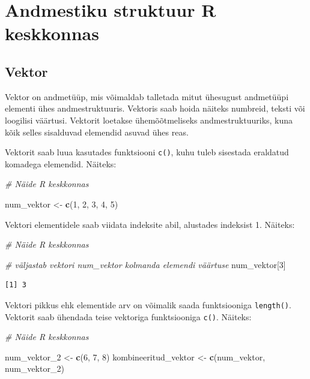 \documentclass[
]{book}
\newenvironment{Shaded}{\begin{snugshade}}{\end{snugshade}}
\newcommand{\CommentTok}[1]{\textcolor[rgb]{0.56,0.35,0.01}{\textit{#1}}}
\newcommand{\DecValTok}[1]{\textcolor[rgb]{0.00,0.00,0.81}{#1}}
\newcommand{\FunctionTok}[1]{\textcolor[rgb]{0.13,0.29,0.53}{\textbf{#1}}}
\newcommand{\NormalTok}[1]{#1}
\newcommand{\OtherTok}[1]{\textcolor[rgb]{0.56,0.35,0.01}{#1}}
\renewenvironment{Shaded} {\begin{snugshade}\footnotesize} {\end{snugshade}}
\begin{document}
\section{Andmestiku struktuur R keskkonnas}\label{andmestiku-struktuur-r-keskkonnas}

\subsection{Vektor}\label{vektor}

Vektor on andmetüüp, mis võimaldab talletada mitut ühesugust andmetüüpi elementi ühes andmestruktuuris. Vektoris saab hoida näiteks numbreid, teksti või loogilisi väärtusi. Vektorit loetakse ühemõõtmeliseks andmestruktuuriks, kuna kõik selles sisalduvad elemendid asuvad ühes reas.

Vektorit saab luua kasutades funktsiooni \texttt{c()}, kuhu tuleb sisestada eraldatud komadega elemendid. Näiteks:

\begin{Shaded}
\begin{Highlighting}[]
\CommentTok{\# Näide R keskkonnas}

\NormalTok{num\_vektor }\OtherTok{\textless{}{-}} \FunctionTok{c}\NormalTok{(}\DecValTok{1}\NormalTok{, }\DecValTok{2}\NormalTok{, }\DecValTok{3}\NormalTok{, }\DecValTok{4}\NormalTok{, }\DecValTok{5}\NormalTok{)}
\end{Highlighting}
\end{Shaded}

Vektori elementidele saab viidata indeksite abil, alustades indeksist 1. Näiteks:

\begin{Shaded}
\begin{Highlighting}[]
\CommentTok{\# Näide R keskkonnas}

\CommentTok{\# väljastab vektori num\_vektor kolmanda elemendi väärtuse}
\NormalTok{num\_vektor[}\DecValTok{3}\NormalTok{] }
\end{Highlighting}
\end{Shaded}

\begin{verbatim}
[1] 3
\end{verbatim}

Vektori pikkus ehk elementide arv on võimalik saada funktsiooniga \texttt{length()}. Vektorit saab ühendada teise vektoriga funktsiooniga \texttt{c()}. Näiteks:

\begin{Shaded}
\begin{Highlighting}[]
\CommentTok{\# Näide R keskkonnas}

\NormalTok{num\_vektor\_2 }\OtherTok{\textless{}{-}} \FunctionTok{c}\NormalTok{(}\DecValTok{6}\NormalTok{, }\DecValTok{7}\NormalTok{, }\DecValTok{8}\NormalTok{)}
\NormalTok{kombineeritud\_vektor }\OtherTok{\textless{}{-}} \FunctionTok{c}\NormalTok{(num\_vektor, num\_vektor\_2)}
\end{Highlighting}
\end{Shaded}
\end{document}
